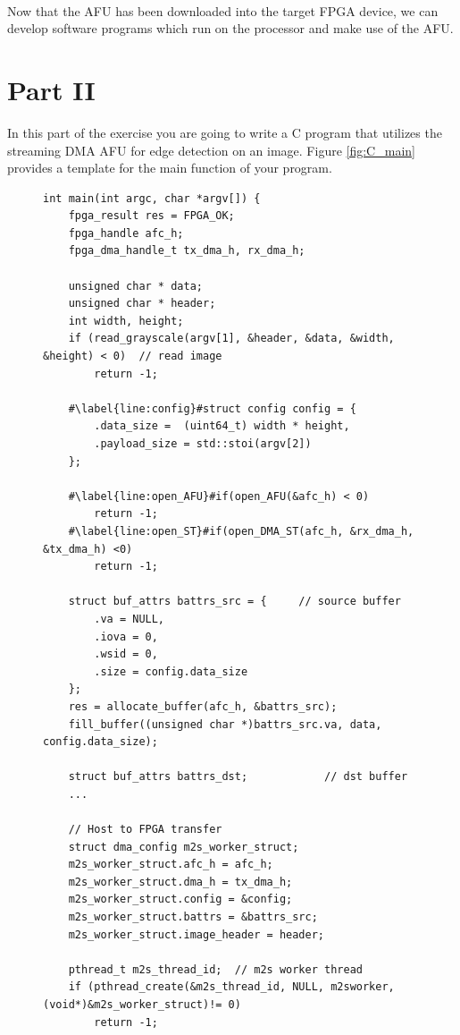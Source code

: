 \documentclass[epsfig,10pt,fullpage]{article}
\begin{document}
~\\
\noindent
Now that the AFU has been downloaded into the target FPGA device, we can develop software 
programs which run on the processor and make use of the AFU.


\section*{Part II}
In this part of the exercise you are going to write a C program that utilizes the streaming DMA AFU for edge detection on an image. Figure \ref{fig:C_main} provides a template for the main function of your program. \\

\lstset{language=C,numbers=left,escapechar=\#}
\begin{figure}
\begin{center}
\begin{minipage}[h]{17.5 cm}
\begin{lstlisting}[name=C_code]
int main(int argc, char *argv[]) {
	fpga_result res = FPGA_OK;
	fpga_handle afc_h;
	fpga_dma_handle_t tx_dma_h, rx_dma_h;

	unsigned char * data;
	unsigned char * header;
	int width, height;
	if (read_grayscale(argv[1], &header, &data, &width, &height) < 0)  // read image
	    return -1;

	#\label{line:config}#struct config config = {
	    .data_size =  (uint64_t) width * height, 
	    .payload_size = std::stoi(argv[2])
	};
	                        
	#\label{line:open_AFU}#if(open_AFU(&afc_h) < 0) 
	    return -1;
	#\label{line:open_ST}#if(open_DMA_ST(afc_h, &rx_dma_h, &tx_dma_h) <0) 
	    return -1;

	struct buf_attrs battrs_src = { 	// source buffer
		.va = NULL,
		.iova = 0,
		.wsid = 0,
		.size = config.data_size
	};
	res = allocate_buffer(afc_h, &battrs_src);
	fill_buffer((unsigned char *)battrs_src.va, data, config.data_size);
	
	struct buf_attrs battrs_dst;            // dst buffer
	...
	
	// Host to FPGA transfer
	struct dma_config m2s_worker_struct;
	m2s_worker_struct.afc_h = afc_h;
	m2s_worker_struct.dma_h = tx_dma_h;
	m2s_worker_struct.config = &config;
	m2s_worker_struct.battrs = &battrs_src;
	m2s_worker_struct.image_header = header;

	pthread_t m2s_thread_id;  // m2s worker thread
	if (pthread_create(&m2s_thread_id, NULL, m2sworker, (void*)&m2s_worker_struct)!= 0) 
		return -1;
		

\end{lstlisting}
\end{minipage}
\end{center}
\end{figure}
\end{document}
